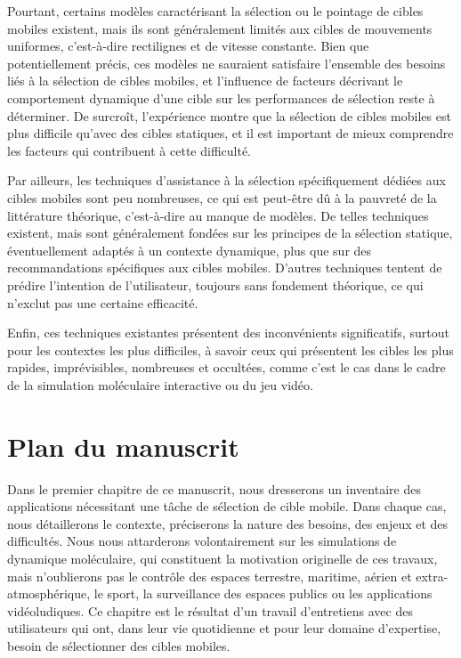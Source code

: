 	Pourtant, certains modèles caractérisant la sélection ou le pointage de cibles mobiles existent, mais ils sont généralement limités aux cibles de mouvements uniformes, c'est-à-dire rectilignes et de vitesse constante. Bien que potentiellement précis, ces modèles ne sauraient satisfaire l'ensemble des besoins liés à la sélection de cibles mobiles, et l'influence de facteurs décrivant le comportement dynamique d'une cible sur les performances de sélection reste à déterminer. De surcroît, l'expérience montre que la sélection de cibles mobiles est plus difficile qu'avec des cibles statiques, et il est important de mieux comprendre les facteurs qui contribuent à cette difficulté.
	
	Par ailleurs, les techniques d'assistance à la sélection spécifiquement dédiées aux cibles mobiles sont peu nombreuses, ce qui est peut-être dû à la pauvreté de la littérature théorique, c'est-à-dire au manque de modèles. De telles techniques existent, mais sont généralement fondées sur les principes de la sélection statique, éventuellement adaptés à un contexte dynamique, plus que sur des recommandations spécifiques aux cibles mobiles. D'autres techniques tentent de prédire l'intention de l'utilisateur, toujours sans fondement théorique, ce qui n'exclut pas une certaine efficacité.
	
	Enfin, ces techniques existantes présentent des inconvénients significatifs, surtout pour les contextes les plus difficiles, à savoir ceux qui présentent les cibles les plus rapides, imprévisibles, nombreuses et occultées, comme c'est le cas dans le cadre de la simulation moléculaire interactive ou du jeu vidéo.

\section*{Plan du manuscrit}
	Dans le premier chapitre de ce manuscrit, nous dresserons un inventaire des applications nécessitant une tâche de sélection de cible mobile. Dans chaque cas, nous détaillerons le contexte, préciserons la nature des besoins, des enjeux et des difficultés. Nous nous attarderons volontairement sur les simulations de dynamique moléculaire, qui constituent la motivation originelle de ces travaux, mais n'oublierons pas le contrôle des espaces terrestre, maritime, aérien et extra-atmosphérique, le sport, la surveillance des espaces publics ou les applications vidéoludiques. Ce chapitre est le résultat d'un travail d'entretiens avec des utilisateurs qui ont, dans leur vie quotidienne et pour leur domaine d'expertise, besoin de sélectionner des cibles mobiles.
	
